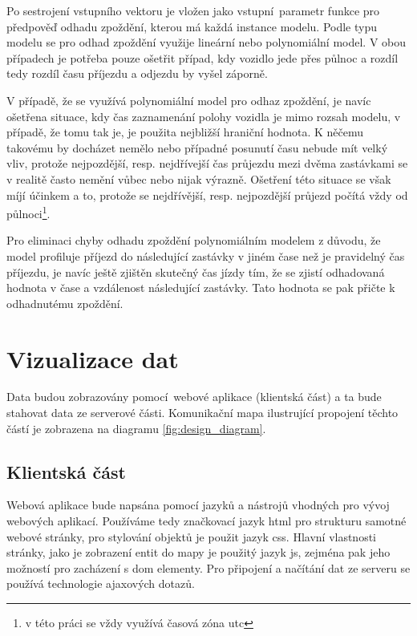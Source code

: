 \bigbreak

Po sestrojení vstupního vektoru je vložen jako vstupní parametr funkce pro předpověď odhadu zpoždění, kterou má každá instance modelu. Podle typu modelu se pro odhad zpoždění využije lineární nebo polynomiální model. V obou případech je potřeba pouze ošetřit případ, kdy vozidlo jede přes půlnoc a rozdíl tedy rozdíl času příjezdu a odjezdu by vyšel záporně.

\bigbreak

V případě, že se využívá polynomiální model pro odhaz zpoždění, je navíc ošetřena situace, kdy čas zaznamenání polohy vozidla je mimo rozsah modelu, v případě, že tomu tak je, je použita nejbližší hraniční hodnota. K něčemu takovému by docházet nemělo nebo případné posunutí času nebude mít velký vliv, protože nejpozdější, resp. nejdřívejší čas průjezdu mezi dvěma zastávkami se v realitě často nemění vůbec nebo nijak výrazně. Ošetření této situace se však míjí účinkem a to, protože se nejdřívější, resp. nejpozdější průjezd počítá vždy od půlnoci\footnote{v této práci se vždy využívá časová zóna \gls{utc}}.

\bigbreak

Pro eliminaci chyby odhadu zpoždění polynomiálním modelem z důvodu, že model profiluje příjezd do následující zastávky v jiném čase než je pravidelný čas příjezdu, je navíc ještě zjištěn skutečný čas jízdy tím, že se zjistí odhadovaná hodnota v čase a vzdálenost následující zastávky. Tato hodnota se pak přičte k odhadnutému zpoždění.

\section{Vizualizace dat}

Data budou zobrazovány pomocí webové aplikace (klientská část) a ta bude stahovat data ze serverové části. Komunikační mapa ilustrující propojení těchto částí je zobrazena na diagramu \ref{fig:design_diagram}.

\subsection{Klientská část}

Webová aplikace bude napsána pomocí jazyků a nástrojů vhodných pro vývoj webových aplikací. Používáme tedy značkovací jazyk \gls{html} pro strukturu samotné webové stránky, pro stylování objektů je použit jazyk \gls{css}. Hlavní vlastnosti stránky, jako je zobrazení entit do mapy je použitý jazyk \gls{js}, zejména pak jeho možností pro zacházení s \gls{dom} elementy. Pro připojení a načítání dat ze serveru se používá technologie \gls{ajax}ových dotazů.

